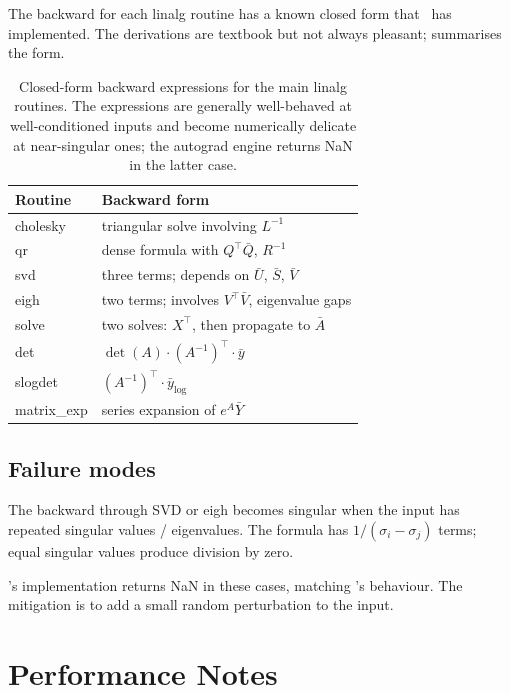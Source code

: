The backward for each linalg routine has a known closed form
that \Lucid\ has implemented. The derivations are textbook but
not always pleasant; 
summarises the form.

\begin{table}[t]
\centering
\small
\begin{tabular}{ll}
\toprule
Routine & Backward form \\
\midrule
cholesky  & triangular solve involving $L^{-1}$ \\
qr        & dense formula with $Q^\top \bar Q$, $R^{-1}$ \\
svd       & three terms; depends on $\bar U$, $\bar S$, $\bar V$ \\
eigh      & two terms; involves $V^\top \bar V$, eigenvalue gaps \\
solve     & two solves: $X^\top$, then propagate to $\bar A$ \\
det       & $\det(A) \cdot (A^{-1})^\top \cdot \bar y$ \\
slogdet   & $(A^{-1})^\top \cdot \bar y_{\log}$ \\
matrix\_exp & series expansion of $e^A \bar Y$ \\
\bottomrule
\end{tabular}
\caption[Linalg backward forms.]{Closed-form backward
expressions for the main linalg routines. The expressions are
generally well-behaved at well-conditioned inputs and become
numerically delicate at near-singular ones; the autograd engine
returns NaN in the latter case.}
\label{tab:linalg:backward_summary}
\end{table}

\subsection{Failure modes}
\label{ssec:linalg:failure_modes}

The backward through SVD or eigh becomes singular when the input
has repeated singular values / eigenvalues. The formula has
$1 / (\sigma_i - \sigma_j)$ terms; equal singular values produce
division by zero.

\Lucid's implementation returns NaN in these cases, matching
's behaviour. The mitigation is to add a small
random perturbation to the input.

\section{Performance Notes}
\label{sec:linalg:perf}

